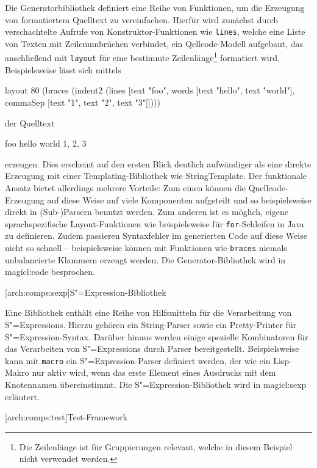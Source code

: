 \documentclass[12pt, a4paper, bibgerm]{scrbook}
\newcommand\icode[1]{\lstinline?#1?}
\newcommand\lsubsection{}
\newcommand\sref{}
\newcommand{\sexp}{S"=Expression}
\newcommand{\sexps}{S"=Expressions}
\begin{document}
Die Generatorbibliothek definiert eine Reihe von Funktionen, um die
Erzeugung von formatiertem Quelltext zu vereinfachen. Hierfür wird
zunächst durch verschachtelte Aufrufe von Konstruktor-Funktionen wie
\icode{lines}, welche eine Liste von Texten mit Zeilenumbrüchen
verbindet, ein Qellcode-Modell aufgebaut, das anschließend mit
\icode{layout} für eine bestimmte Zeilenlänge\footnote{Die Zeilenlänge
  ist für Gruppierungen relevant, welche in diesem Beispiel nicht
  verwendet werden.} formatiert wird. Beispielsweise lässt sich mittels
\begin{code}
layout 80 (braces 
           (indent2 
            (lines [text "foo",
                    words [text "hello", text "world"],
                    commaSep [text "1", text "2", text "3"]])))
\end{code}
der Quelltext
\begin{code}
{foo
  hello world
  1, 2, 3}
\end{code}
erzeugen. Dies erscheint auf den ersten Blick deutlich aufwändiger als
eine direkte Erzeugung mit einer Templating-Bibliothek wie
StringTemplate. Der funktionale Ansatz bietet allerdings mehrere Vorteile:
Zum einen können die Quellcode-Erzeugung auf diese Weise auf viele
Komponenten aufgeteilt und so beispielsweise direkt in (Sub-)Parsern
benutzt werden. Zum anderen ist es möglich, eigene sprachspezifische
Layout-Funktionen wie beispielsweise für \icode{for}-Schleifen in Java
zu definieren. Zudem passieren Syntaxfehler im generierten Code auf
diese Weise nicht so schnell -- beispielsweise können mit Funktionen wie
\icode{braces} niemals unbalancierte Klammern erzeugt werden. Die
Generator-Bibliothek wird in \sref{magicl:code} besprochen.

\lsubsection[arch:comps:sexp]{\sexp{}-Bibliothek}

Eine Bibliothek enthält eine Reihe von Hilfsmitteln für die Verarbeitung
von \sexps{}. Hierzu gehören ein String-Parser sowie ein Pretty-Printer
für \sexp{}-Syntax. Darüber hinaus werden einige spezielle Kombinatoren
für das Verarbeiten von \sexps{} durch Parser
bereitgestellt. Beispielsweise kann mit \icode{macro} ein \sexp{}-Parser
definiert werden, der wie ein Lisp-Makro nur aktiv wird, wenn das erste
Element eines Ausdrucks mit dem Knotennamen übereinstimmt. Die
\sexp{}-Bibliothek wird in \sref{magicl:sexp} erläutert.

\lsubsection[arch:comps:test]{Test-Framework}
\end{document}
